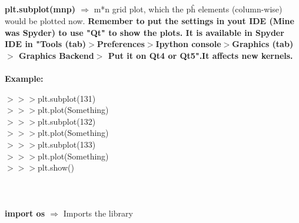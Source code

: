 \documentclass[a4paper,18pt]{article}
\begin{document}

\subsection{\colorbox {matgreen}{\color{white}{\large Subplots}}}
\textbf{plt.subplot(mnp) $\Rightarrow$} m*n grid plot, which the p\^{h} elements (column-wise) would be plotted now. \textbf{\textcolor{important}{Remember to put the settings in yout IDE (Mine was Spyder) to use "Qt" to show the plots. It is available in Spyder IDE in "Tools (tab)$>$Preferences$>$Ipython console$>$Graphics (tab)$>$ Graphics Backend$>$ Put it on Qt4 or Qt5".It affects new kernels.}}\\\\
\textbf{Example:\\}

$>>>$plt.subplot(131)\\

$>>>$plt.plot(Something)\\

$>>>$plt.subplot(132)\\

$>>>$plt.plot(Something)\\

$>>>$plt.subplot(133)\\

$>>>$plt.plot(Something)\\

$>>>$plt.show()\\\\


\newpage

\section{\colorbox {Abi}{}}

\subsection{\colorbox {matgreen}{\color{white}{\large import os}}}
\textbf{import os $\Rightarrow$} Imports the library\\\\
\end{document}
